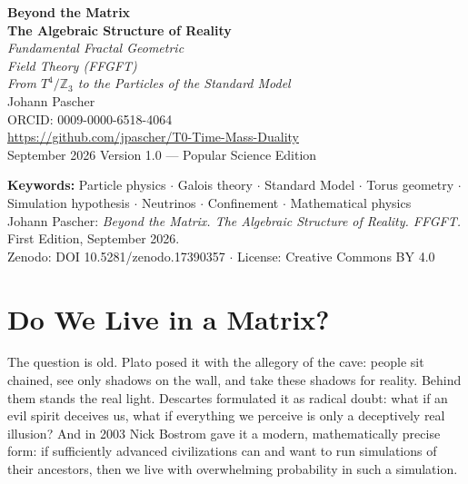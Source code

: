 \documentclass[11pt,oneside]{book}
\begin{document}
\frontmatter
\pagestyle{fancy}
\makeatletter\let\ps@plain\ps@fancy\makeatother

\begin{titlepage}
  \centering\vspace*{1.5cm}
  {\Huge\bfseries\color{blue!70!black}
    Beyond the Matrix}\\[0.6cm]
  {\Large\bfseries\color{blue!40!black}
    The Algebraic Structure of Reality}\\[1cm]
  {\LARGE\itshape Fundamental Fractal Geometric\\[0.2cm]
    Field Theory (FFGFT)}\\[0.5cm]
  {\large\itshape From $T^4/\mathbb{Z}_3$ to the Particles of the Standard Model}\\[2cm]
  {\large Johann Pascher}\\[0.3cm]
  {\normalsize ORCID: 0009-0000-6518-4064}\\[0.3cm]
  {\normalsize\url{https://github.com/jpascher/T0-Time-Mass-Duality}}\\[1.5cm]
  {\normalsize September 2026}
  \vfill{\small Version 1.0 --- Popular Science Edition}
\end{titlepage}

\newpage\thispagestyle{empty}%
{\small\noindent\textbf{Keywords:} Particle physics $\cdot$ Galois theory $\cdot$ Standard Model $\cdot$ Torus geometry $\cdot$ Simulation hypothesis $\cdot$ Neutrinos $\cdot$ Confinement $\cdot$ Mathematical physics\\[1em]
\noindent Johann Pascher: \textit{Beyond the Matrix. The Algebraic Structure of Reality. FFGFT.}\\
First Edition, September 2026.\\[0.6em]
\noindent Zenodo: DOI 10.5281/zenodo.17390357 $\cdot$ License: Creative Commons BY 4.0}

\tableofcontents
\mainmatter

\chapter{Do We Live in a Matrix?}

The question is old. Plato posed it with the allegory of the cave: people
sit chained, see only shadows on the wall, and take these shadows for
reality. Behind them stands the real light. Descartes formulated it as
radical doubt: what if an evil spirit deceives us, what if everything we
perceive is only a deceptively real illusion? And in 2003 Nick Bostrom gave
it a modern, mathematically precise form: if sufficiently advanced
civilizations can and want to run simulations of their ancestors, then we
live with overwhelming probability in such a simulation.
\end{document}
